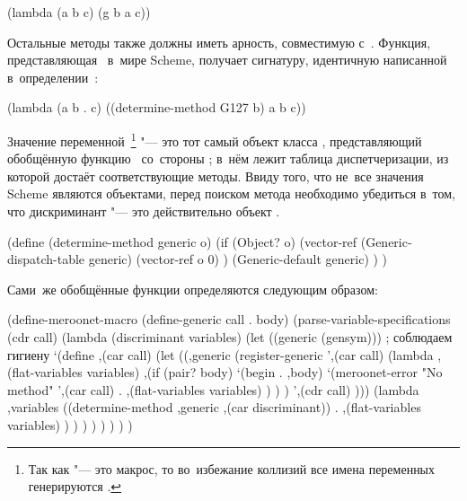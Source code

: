 \begin{code:lisp}
(lambda (a b c) (g b a c))
\end{code:lisp}

Остальные методы также должны иметь арность, совместимую с~.
Функция, представляющая~ в~мире Scheme, получает сигнатуру, идентичную
написанной в~определении~:

\begin{code:lisp}
(lambda (a b . c) ((determine-method G127 b) a b c))
\end{code:lisp}

Значение переменной~\footnote{Так как  "--- это
макрос, то во~избежание коллизий все имена переменных генерируются .}
"--- это тот самый объект класса , представляющий обобщённую
функцию~ со~стороны {\Meroonet}; в~нём лежит таблица диспетчеризации, из
которой  достаёт соответствующие методы. Ввиду того, что
не~все значения Scheme являются объектами, перед поиском метода необходимо
убедиться в~том, что дискриминант "--- это действительно объект {\Meroonet}.

\begin{code:lisp}
(define (determine-method generic o)
  (if (Object? o)
      (vector-ref (Generic-dispatch-table generic)
                  (vector-ref o 0) )
      (Generic-default generic) ) )
\end{code:lisp}

Сами~же обобщённые функции определяются следующим образом:
%
\begin{code:lisp}
(define-meroonet-macro (define-generic call . body)
  (parse-variable-specifications
   (cdr call)
   (lambda (discriminant variables)
     (let ((generic (gensym)))      ; соблюдаем гигиену
       `(define ,(car call)
          (let ((,generic (register-generic
                           ',(car call)
                           (lambda ,(flat-variables variables)
                             ,(if (pair? body)
                                  `(begin . ,body)
                                  `(meroonet-error
                                    "No method" ',(car call)
                                    . ,(flat-variables variables) ) ) )
                           ',(cdr call) )))
            (lambda ,variables
              ((determine-method ,generic ,(car discriminant))
               . ,(flat-variables variables) ) ) ) ) ) ) ) )
\end{code:lisp}


